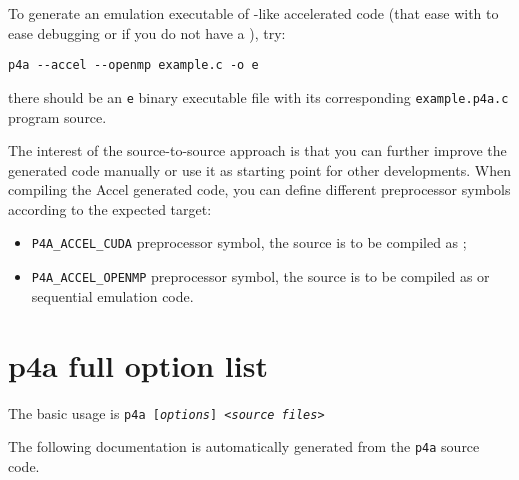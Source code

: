 \documentclass[a4paper]{article}
\begin{document}
To generate an \Aopenmp emulation executable of \Agpu-like accelerated
code (that ease with to ease debugging or if you do not have a \Agpu), try:
\begin{verbatim}
p4a --accel --openmp example.c -o e
\end{verbatim}
there should be an \texttt{e} binary executable file with its
corresponding \texttt{example.p4a.c} program source.

The interest of the source-to-source approach is that you can further
improve the generated code manually or use it as starting point for other
developments. When compiling the \Apfa Accel generated code, you can
define different preprocessor symbols according to the expected target:
\begin{itemize}
\item \verb|P4A_ACCEL_CUDA| preprocessor symbol, the source is to be
  compiled as \Acuda;
\item \verb|P4A_ACCEL_OPENMP| preprocessor symbol, the source is to be
  compiled as \Aopenmp or sequential emulation code.
\end{itemize}


\section{p4a full option list}
\label{sec:options}

The basic usage is \texttt{p4a [\emph{options}] <\emph{source files}>}

The following documentation is automatically generated from the
\texttt{p4a} source code.



\end{document}
